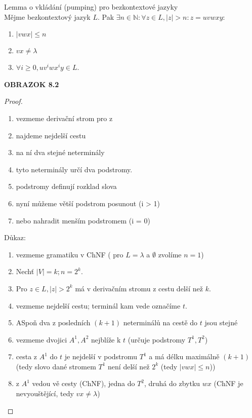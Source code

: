 \documentclass[../main.tex]{subfiles}
\begin{document}
\begin{theorem}
    Lemma o vkládání (pumping) pro bezkontextové jazyky\\

    Mějme bezkontextový jazyk $L$. Pak $ \exists n \in \mathbb{N} : \forall z\in L, |z| > n : z = uvwxy :$
    \begin{enumerate}
        \item $|vwx| \leq n$
        \item $vx \neq \lambda$
        \item $\forall i \geq 0, uv^iwx^iy \in L$.
    \end{enumerate}
    \textbf{OBRAZOK 8.2}
    \begin{proof}
        \begin{enumerate}
            náznak důkazu:
            \item vezmeme derivační strom pro z
            \item najdeme nejdelší cestu
            \item na ní dva stejné neterminály
            \item tyto neterminály určí dva podstromy.
            \item podstromy definují rozklad slova
            \item nyní můžeme větší podstrom posunout (i > 1)
            \item nebo nahradit menším podstromem (i = 0)
        \end{enumerate}
        Důkaz:
        \begin{enumerate}
            \item vezmeme gramatiku v ChNF ( pro $L = {\lambda}$ a $\emptyset$ zvolíme   $n = 1$)
            \item Nechť $|V| = k; n=2^k$.
            \item Pro $z\in L, |z| > 2^k$ má v derivačním stromu z cestu delší než $k$.
            \item vezmeme nejdelší cestu; terminál kam vede označíme $t$.
            \item ASpoň dva z posledních $(k+1)$ neterminálů na cestě do $t$ jsou stejné
            \item vezmeme dvojici $A^1,A^2$ nejblíže k $t$ (určuje podstromy $T^1,T^2$)
            \item cesta z $A^1$ do $t$ je nejdelší v podstromu $T^1$ a má délku maximálně $(k+1)$ (tedy slovo dané stromem $T^1$ není delší než $2^k$ (tedy $|vwx| \leq n$))
            \item z $A^1$ vedou vě cesty (ChNF), jedna do $T^2$, druhá do zbytku $wx$ (ChNF je nevyouštějící, tedy $vx \neq \lambda$)

\end{enumerate}
\end{proof}
\end{theorem}
\end{document}
